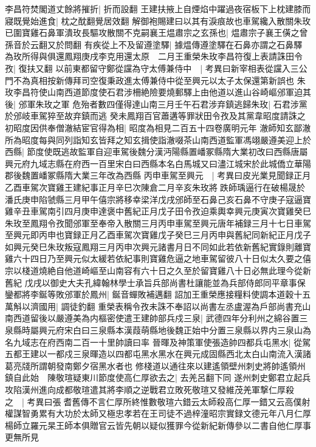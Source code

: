 李昌符焚閣道丈餘將摧折|{
	折而設翻}
王建扶掖上自煙焰中躍過夜宿板下上枕建膝而寢既覺始進食|{
	枕之酖翻覺居效翻}
解御袍賜建曰以其有淚痕故也車駕纔入散關朱玫已圍寶雞石鼻軍潰玫長驅攻散關不克嗣襄王煴肅宗之玄孫也|{
	煴肅宗子襄王僙之曾孫音於云翻又於問翻}
有疾從上不及留遵塗驛|{
	據煴傳遵塗驛在石鼻亦謂之石鼻驛}
為玫所得與俱還鳳翔庚戌李克用還太原　二月王重榮朱玫李昌符復上表請誅田令孜|{
	復扶又翻}
以前東都留守鄭從讜為守太傅兼侍中　|{
	考異曰新宰相表從讜入三公門不為真相按新傳拜司空復秉政進太傅兼侍中從至興元以太子太保還第新誤也}
朱玫李昌符使山南西道節度使石君涉柵絶險要燒郵驛上由他道以進山谷崎嶇邠軍迫其後|{
	邠軍朱玫之軍}
危殆者數四僅得達山南三月壬午石君涉弃鎮逃歸朱玫|{
	石君涉黨於邠岐車駕猝至故弃鎮而逃}
癸未鳳翔百官蕭遘等罪狀田令孜及其黨韋昭度請誅之初昭度因供奉僧澈結宦官得為相|{
	昭度為相見二百五十四卷廣明元年}
澈師知玄鄙澈所為昭度每與同列詣知玄皆拜之知玄揖使詣澈啜茶山南西道監軍馮翊嚴遵美迎上於西縣|{
	節度使既逃故監軍自迎車駕後魏分漢沔陽縣置嶓冢縣隋大業初改曰西縣唐屬興元府九域志縣在府西一百里宋白曰西縣本名白馬城又曰濜江城宋於此城僑立華陽郡後魏置嶓冢縣隋大業三年改為西縣}
丙申車駕至興元　|{
	考異曰皮光業見聞録正月乙酉車駕次寶雞王建紀事正月辛巳次陳倉二月辛亥朱玫將跌師瑀逼行在破楊晟於潘氏庚申陷虢縣三月甲午僖宗將移幸梁洋戊戌邠師至石鼻己亥石鼻不守庚子寇逼寶雞辛丑車駕南引四月庚申達褒中舊紀正月戊子田令孜迫乘輿幸興元庚寅次寶雞癸巳朱玫至鳳翔令孜聞邠軍至奉帝入散關三月丙申車駕至興元唐年補録三月十七日車駕至興元即丙申也寶録正月乙酉車駕次寶雞戊子癸巳三月丙申與舊紀同新紀正月戊子如興元癸巳朱玫叛寇鳳翔三月丙申次興元諸書月日不同如此若依新舊紀實錄則離寶雞六十四日乃至興元似太緩若依紀事則寶雞危逼之地車駕留彼八十日似太久要之僖宗以棧道燒絶自他道崎嶇至山南容有六十日之久至於留寶雞八十日必無此理今從新舊紀}
戊戌以御史大夫孔緯翰林學士承旨兵部尚書杜讓能並為兵部侍郎同平章事保鑾都將李鋋等敗邠軍於鳳州|{
	鋋音蟬敗補邁翻}
詔加王重榮應接糧料使調本道穀十五萬斛以濟國用|{
	調徒釣翻}
重榮表稱令孜未誅不奉詔以尚書左丞盧渥為戶部尚書充山南西道留後以嚴遵美為内樞密使遣王建帥部兵戍三泉|{
	武德四年分利州之綿谷置三泉縣時屬興元府宋白曰三泉縣本漢葭萌縣地後魏正始中分置三泉縣以界内三泉山為名九域志在府西南二百一十里帥讀曰率}
晉暉及神策軍使張造帥四都兵屯黑水|{
	從駕五都王建以一都戍三泉暉造以四都屯黑水黑水在興元成固縣西北太白山南流入漢諸葛亮牋所謂朝發南鄭夕宿黑水者也}
修棧道以通往來以建遙領壁州刺史將帥遙領州鎮自此始　陳敬瑄疑東川節度使高仁厚欲去之|{
	去羌呂翻下同}
遂州刺史鄭君立起兵攻陷漢州進向成都敬瑄遣其將李順之逆戰君立敗死敬瑄又發維茂羌軍撃仁厚殺之　|{
	考異曰張耆舊傳不言仁厚所終惟數敬瑄六錯云太師殺高仁厚一錯又云高僕射權謀智勇累有大功於太師又極忠孝若在王司徒不過梓潼昭宗實録文德元年八月仁厚楊師立羅元杲王師本俱贈官云皆先朝以疑似獲罪今從新紀新傳參以二書自他仁厚事更無所見}

